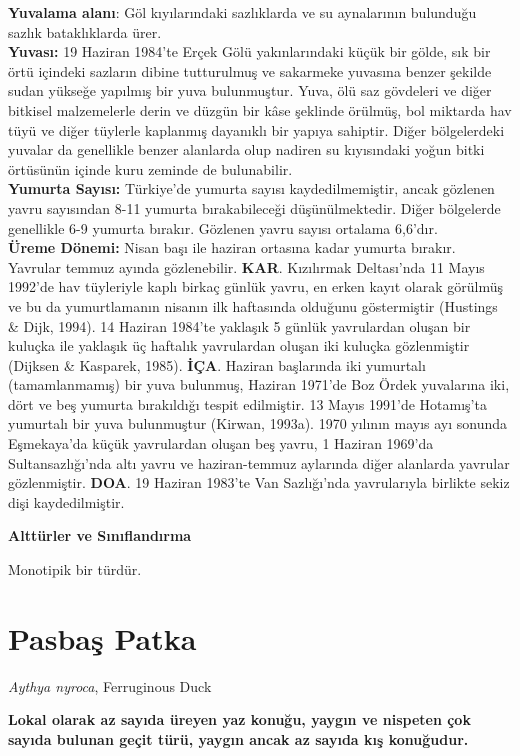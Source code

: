 \documentclass[
  a4paper,
  DIV=11,
  numbers=noendperiod]{scrreprt}
\begin{document}
\textbf{Yuvalama alanı}: Göl kıyılarındaki sazlıklarda ve su aynalarının
bulunduğu sazlık bataklıklarda ürer.\\
\textbf{Yuvası:} 19 Haziran 1984'te Erçek Gölü yakınlarındaki küçük bir
gölde, sık bir örtü içindeki sazların dibine tutturulmuş ve sakarmeke
yuvasına benzer şekilde sudan yükseğe yapılmış bir yuva bulunmuştur.
Yuva, ölü saz gövdeleri ve diğer bitkisel malzemelerle derin ve düzgün
bir kâse şeklinde örülmüş, bol miktarda hav tüyü ve diğer tüylerle
kaplanmış dayanıklı bir yapıya sahiptir. Diğer bölgelerdeki yuvalar da
genellikle benzer alanlarda olup nadiren su kıyısındaki yoğun bitki
örtüsünün içinde kuru zeminde de bulunabilir.\\
\textbf{Yumurta Sayısı:} Türkiye'de yumurta sayısı kaydedilmemiştir,
ancak gözlenen yavru sayısından 8-11 yumurta bırakabileceği
düşünülmektedir. Diğer bölgelerde genellikle 6-9 yumurta bırakır.
Gözlenen yavru sayısı ortalama 6,6'dır.\\
\textbf{Üreme Dönemi:} Nisan başı ile haziran ortasına kadar yumurta
bırakır. Yavrular temmuz ayında gözlenebilir. \textbf{KAR}. Kızılırmak
Deltası'nda 11 Mayıs 1992'de hav tüyleriyle kaplı birkaç günlük yavru,
en erken kayıt olarak görülmüş ve bu da yumurtlamanın nisanın ilk
haftasında olduğunu göstermiştir (Hustings \& Dijk, 1994). 14 Haziran
1984'te yaklaşık 5 günlük yavrulardan oluşan bir kuluçka ile yaklaşık üç
haftalık yavrulardan oluşan iki kuluçka gözlenmiştir (Dijksen \&
Kasparek, 1985). \textbf{İÇA}. Haziran başlarında iki yumurtalı
(tamamlanmamış) bir yuva bulunmuş, Haziran 1971'de Boz Ördek yuvalarına
iki, dört ve beş yumurta bırakıldığı tespit edilmiştir. 13 Mayıs 1991'de
Hotamış'ta yumurtalı bir yuva bulunmuştur (Kirwan, 1993a). 1970 yılının
mayıs ayı sonunda Eşmekaya'da küçük yavrulardan oluşan beş yavru, 1
Haziran 1969'da Sultansazlığı'nda altı yavru ve haziran-temmuz aylarında
diğer alanlarda yavrular gözlenmiştir. \textbf{DOA}. 19 Haziran 1983'te
Van Sazlığı'nda yavrularıyla birlikte sekiz dişi kaydedilmiştir.

\textbf{Alttürler ve Sınıflandırma}

Monotipik bir türdür.

\section{Pasbaş Patka}\label{pasbaux15f-patka}

\emph{Aythya nyroca}, Ferruginous Duck

\textbf{Lokal olarak az sayıda üreyen yaz konuğu, yaygın ve nispeten çok
sayıda bulunan geçit türü, yaygın ancak az sayıda kış konuğudur.}
\end{document}
